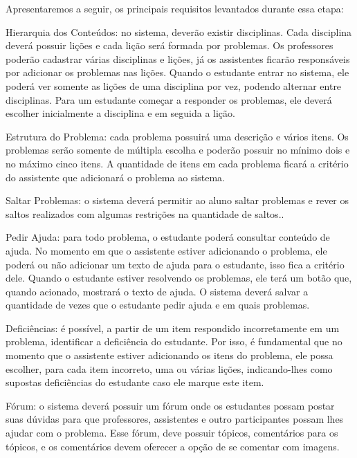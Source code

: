 Apresentaremos a seguir, os principais requisitos levantados durante essa etapa:

\begin{alineascomponto}
	\item Hierarquia dos Conteúdos: no sistema, dever\~ao existir disciplinas. Cada disciplina dever\'a possuir li\c{c}\~oes e cada li\c{c}\~ao ser\'a formada por problemas. Os professores poder\~ao 
cadastrar v\'arias disciplinas e li\c{c}\~oes, j\'a os assistentes ficar\~ao responsáveis por adicionar os problemas nas li\c{c}\~oes. Quando o estudante entrar no sistema, ele poder\'a ver somente 
as li\c{c}\~oes de uma disciplina por vez, podendo alternar entre disciplinas. Para um estudante come\c{c}ar a responder os problemas, ele dever\'a escolher inicialmente a disciplina e em seguida a 
li\c{c}\~ao. 

	\item Estrutura do Problema: cada problema possuir\'a uma descri\c{c}\~ao e v\'arios itens. Os problemas ser\~ao somente de m\'ultipla escolha e poder\~ao possuir no m\'inimo dois e no m\'aximo 
cinco itens. A quantidade de itens em cada problema ficar\'a a crit\'erio do assistente que adicionar\'a o problema ao sistema.

	\item Saltar Problemas: o sistema deverá permitir ao aluno saltar problemas e rever os saltos 
realizados com algumas restrições na quantidade de saltos..
	
	\item Pedir Ajuda: para todo problema, o estudante poderá consultar conte\'udo de ajuda. No momento em que o assistente estiver adicionando o problema, ele poderá ou não adicionar um texto de 
ajuda para o estudante, isso fica a critério dele. Quando o estudante estiver resolvendo os problemas, ele terá um botão que, quando acionado, mostrar\'a o texto de ajuda. O sistema dever\'a salvar a 
quantidade 
de vezes que o estudante pedir ajuda e em quais problemas.
	
	\item Defici\^encias: \'e possível, a partir de um item respondido incorretamente em um problema, identificar a deficiência do estudante. Por isso, é fundamental que no momento que o 
assistente estiver adicionando os itens do problema, ele possa escolher, para cada item incorreto, uma ou várias li\c{c}\~oes, indicando-lhes como supostas defici\^encias do estudante caso ele marque 
este item.	
	\item F\'orum: o sistema deverá possuir um fórum onde os estudantes possam postar suas dúvidas para que professores, assistentes e outro participantes possam lhes ajudar com o problema. Esse fórum, deve possuir tópicos, comentários para os tópicos, e os comentários devem oferecer a opção de se comentar com imagens. 

\end{alineascomponto}

